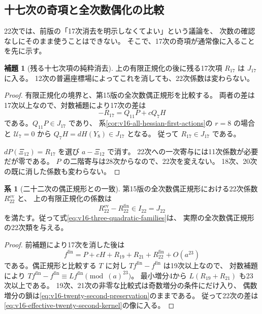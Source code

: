 \documentclass[a4paper,11pt]{ltjsarticle}
\theoremstyle{definition}
\newtheorem{lemma}[theorem]{補題}
\newtheorem{corollary}[theorem]{系}
\begin{document}
\subsection{十七次の奇項と全次数偶化の比較}

22次では、前版の「17次消去を明示しなくてよい」という議論を、
次数の確認なしにそのまま使うことはできない。
そこで、17次の奇項が通常像に入ることを先に示す。

\begin{lemma}[残る十七次項の純粋消去]
\label{lem:v16-seventeenth-odd-removal}
上の有限正規化の後に残る17次項 $R_{17}$ は $J_{17}$ に入る。
12次の普遍座標場によってこれを消しても、22次係数は変わらない。
\end{lemma}

\begin{proof}
有限正規化の境界と、第15版の全次数偶正規形を比較する。
両者の差は17次以上なので、対数補題により17次の差は
\[
 -R_{17}=Q_{11}P+cQ_7H
\]
である。$Q_{11}P\in J_{17}$ であり、
系\ref{cor:v16-all-hessian-first-actions}の $r=8$ の場合と
$\mathcal U_7=0$ から $Q_7H=dH(Y_8)\in J_{17}$ となる。
従って $R_{17}\in J_{17}$ である。

$dP(\Xi_{12})=R_{17}$ を選び $a-\Xi_{12}$ で消す。
22次への一次寄与には11次係数が必要だが零である。
$P$ の二階寄与は28次からなので、22次を変えない。
18次、20次の既に消した係数も変わらない。
\end{proof}

\begin{corollary}[二十二次の偶正規形との一致]
\label{cor:v16-evenization-twenty-second-class}
第15版の全次数偶正規形における22次係数 $R_{22}^{\mathrm{ev}}$ と、
上の有限正規化の係数は
\[
 R_{22}^{\mathrm{ev}}-R_{22}^{\mathrm{fin}}\in I_{22}=J_{22}
\]
を満たす。従って式\eqref{eq:v16-three-quadratic-families}は、
実際の全次数偶正規形の22次類を与える。
\end{corollary}

\begin{proof}
前補題により17次を消した後は
\[
 f^{\mathrm{fin}}=P+cH+R_{19}+R_{21}+R_{22}^{\mathrm{fin}}+O(a^{23})
\]
である。偶正規形と比較する $T$ に対し $Tf^{\mathrm{fin}}-f^{\mathrm{fin}}$ は19次以上なので、
対数補題により $Tf^{\mathrm{fin}}-f^{\mathrm{fin}}\equiv Lf^{\mathrm{fin}}\pmod{(a)^{23}}$。
最小増分4から $L(R_{19}+R_{21})$ も23次以上である。
19次、21次の非零な比較式は奇数増分の条件にだけ入り、
偶数増分の鎖は\eqref{eq:v16-twenty-second-preservation}のままである。
従って22次の差は\eqref{eq:v16-effective-twenty-second-kernel}の像に入る。
\end{proof}
\end{document}
